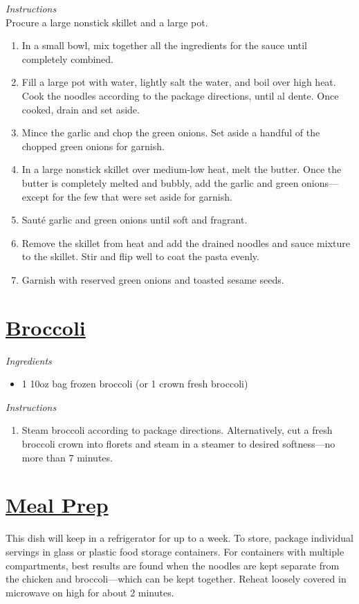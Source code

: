 \documentclass{article}
\newcommand{\ingredients}[1][\Large\emph{Ingredients}]{%
    \emph{#1}\\}
\newcommand{\instructions}[1][\Large\emph{Instructions}]{%
    \emph{#1}\\}
\begin{document}
\begin{minipage}{\textwidth}
\begin{vwcol}[widths={0.6,0.4}, rule=0pt]
\begin{minipage}{0.55\textwidth}
\instructions
Procure a large nonstick skillet and a large pot.
\begin{enumerate}
    \item In a small bowl, mix together all the ingredients for the sauce until completely combined.
    \item Fill a large pot with water, lightly salt the water, and boil over high heat. Cook the noodles according to the package directions, until al dente. Once cooked, drain and set aside.
    \item Mince the garlic and chop the green onions. Set aside a handful of the chopped green onions for garnish.
    \item In a large nonstick skillet over medium-low heat, melt the butter. Once the butter is completely melted and bubbly, add the garlic and green onions---except for the few that were set aside for garnish.
    \item Sauté garlic and green onions until soft and fragrant.
    \item Remove the skillet from heat and add the drained noodles and sauce mixture to the skillet. Stir and flip well to coat the pasta evenly.
    \item Garnish with reserved green onions and toasted sesame seeds.
\end{enumerate}
\end{minipage}

\newpage
\begin{minipage}{0.3\linewidth}
\section*{\underline{Broccoli}}
\ingredients
\vspace{-1em}
\begin{itemize}
    \item 1 10oz bag frozen broccoli (or 1 crown fresh broccoli)
\end{itemize}
\vspace{1em}

\instructions
\vspace{-1em}
\begin{enumerate}
    \item Steam broccoli according to package directions. Alternatively, cut a fresh broccoli crown into florets and steam in a steamer to desired softness---no more than $7$ minutes.
\end{enumerate}

\section*{\underline{Meal Prep}}
This dish will keep in a refrigerator for up to a week. To store, package individual servings in glass or plastic food storage containers. For containers with multiple compartments, best results are found when the noodles are kept separate from the chicken and broccoli---which can be kept together. Reheat loosely covered in microwave on high for about 2 minutes.
\end{minipage}
\end{vwcol}
\end{minipage}
\end{document}
